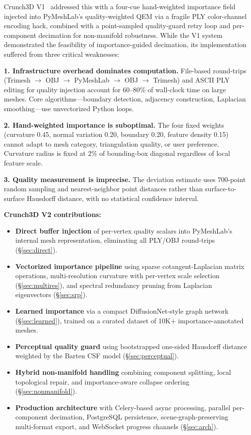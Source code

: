 \documentclass[10pt, twocolumn, a4paper]{article}
\begin{document}
Crunch3D V1~\cite{kumar2026crunch3d} addressed this with a four-cue
hand-weighted importance field injected into PyMeshLab's
quality-weighted QEM via a fragile PLY color-channel encoding hack,
combined with a point-sampled quality-guard retry loop and per-component
decimation for non-manifold robustness. While the V1 system
demonstrated the feasibility of importance-guided decimation, its
implementation suffered from three critical weaknesses:

\noindent\textbf{1. Infrastructure overhead dominates computation.}
File-based round-trips (Trimesh $\to$ OBJ $\to$ PyMeshLab $\to$ OBJ
$\to$ Trimesh) and ASCII PLY editing for quality injection account for
60--80\% of wall-clock time on large meshes. Core algorithms---boundary
detection, adjacency construction, Laplacian smoothing---use unvectorized
Python loops.

\noindent\textbf{2. Hand-weighted importance is suboptimal.}
The four fixed weights (curvature 0.45, normal variation 0.20, boundary
0.20, feature density 0.15) cannot adapt to mesh category,
triangulation quality, or user preference. Curvature radius is fixed at
2\% of bounding-box diagonal regardless of local feature scale.

\noindent\textbf{3. Quality measurement is imprecise.}
The deviation estimate uses 700-point random sampling and
nearest-neighbor point distances rather than surface-to-surface
Hausdorff distance, with no statistical confidence interval.

\textbf{Crunch3D V2 contributions:}
\begin{itemize}
  \item[\textbf{(i)}] \textbf{Direct buffer injection} of per-vertex
  quality scalars into PyMeshLab's internal mesh representation,
  eliminating all PLY/OBJ round-trips (\S\ref{sec:direct}).
  \item[\textbf{(ii)}] \textbf{Vectorized importance pipeline} using
  sparse cotangent-Laplacian matrix operations, multi-resolution
  curvature with per-vertex scale selection (\S\ref{sec:multires}), and
  spectral redundancy pruning from Laplacian eigenvectors
  (\S\ref{sec:srp}).
  \item[\textbf{(iii)}] \textbf{Learned importance} via a compact
  DiffusionNet-style graph network (\S\ref{sec:learned}), trained on a
  curated dataset of 10K+ importance-annotated meshes.
  \item[\textbf{(iv)}] \textbf{Perceptual quality guard} using
  bootstrapped one-sided Hausdorff distance weighted by the Barten CSF
  model (\S\ref{sec:perceptual}).
  \item[\textbf{(v)}] \textbf{Hybrid non-manifold handling}
  combining component splitting, local topological repair, and
  importance-aware collapse ordering (\S\ref{sec:nonmanifold}).
  \item[\textbf{(vi)}] \textbf{Production architecture} with
  Celery-based async processing, parallel per-component decimation,
  PostgreSQL persistence, scene-graph-preserving multi-format export,
  and WebSocket progress channels (\S\ref{sec:arch}).
\end{itemize}
\end{document}
